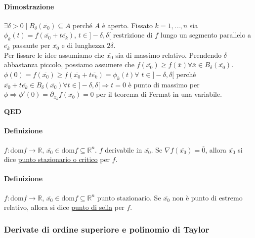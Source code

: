 \documentclass{article}
\newcommand{\R}{\mathbb{R}}
\newcommand{\dom}{\text{dom}}
\begin{document}
\paragraph{{Dimostrazione}}
$\exists \delta >0 \mid B_\delta (\overline{x_0})\subseteq A$ perché $A$ è aperto. Fissato $k=1,...,n$ sia $\phi_k(t)=f(\overline{x_0}+t\overline{e_k})$, $ t \in ]-\delta,\delta[$ restrizione di $f$ lungo un segmento parallelo  a $\overline{e_k}$ passante per $\overline{x_0}$ e di lunghezza $2\delta$.\\
Per fissare le idee assumiamo che $\overline{x_0}$ sia di massimo relativo. Prendendo $\delta$ abbastanza piccolo, possiamo assumere che $f(\overline{x_0})\geq f(\overline{x})\forall \overline{x} \in B_\delta (\overline{x_0})$.\\
$\phi(0)=f(\overline{x_0})\geq f(\overline{x_0}+t\overline{e_k})=\phi_k(t)\forall \,\, t \in ]-\delta,\delta[$ perché $\overline{x_0}+t \overline{e_k} \in B_\delta (\overline{x_0})\forall t \in ]-\delta,\delta[ \Rightarrow t=0$ è punto di massimo per $\phi \Rightarrow \phi'(0)=\partial_{x_k}f(\overline{x_0})=0$ per il teorema di Fermat in una variabile.
\begin{flushright}
    \textbf{QED}
\end{flushright}

\paragraph{{Definizione}}
$f:\dom f \rightarrow \R$, $\overline{x_0}\in \dom f \subseteq \R^n$. $f$ derivabile in $\overline{x_0}$. Se $\nabla f(\overline{x_0})=\overline{0}$, allora $\overline{x_0}$ si dice \underline{punto stazionario o critico} per $f$.

\paragraph{{Definizione}}
$f: \dom f \rightarrow \R$, $ \overline{x_0}\in \dom f \subseteq \R^n$ punto stazionario. Se $\overline{x_0}$ non è punto di estremo relativo, allora si dice \underline{punto di sella} per $f$.

\subsubsection{{Derivate di ordine superiore e polinomio di Taylor}}
\end{document}

